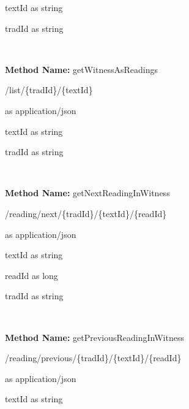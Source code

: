 \begin{parameter}
textId as string
\end{parameter}

\begin{parameter}
tradId as string
\end{parameter}

\

\textbf{Method Name: }getWitnessAsReadings
\begin{get}
/list/\{tradId\}/\{textId\}
\end{get}

\begin{response}
 as application/json
\end{response}

\begin{parameter}
textId as string
\end{parameter}

\begin{parameter}
tradId as string
\end{parameter}

\

\textbf{Method Name: }getNextReadingInWitness
\begin{get}
/reading/next/\{tradId\}/\{textId\}/\{readId\}
\end{get}

\begin{response}
 as application/json
\end{response}

\begin{parameter}
textId as string
\end{parameter}

\begin{parameter}
readId as long
\end{parameter}

\begin{parameter}
tradId as string
\end{parameter}

\

\textbf{Method Name: }getPreviousReadingInWitness
\begin{get}
/reading/previous/\{tradId\}/\{textId\}/\{readId\}
\end{get}

\begin{response}
 as application/json
\end{response}

\begin{parameter}
textId as string
\end{parameter}

